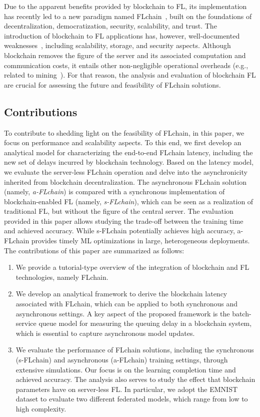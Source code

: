 \documentclass[lettersize,journal]{IEEEtran}
\begin{document}
Due to the apparent benefits provided by blockchain to FL, its implementation has recently led to a new paradigm named FLchain~\cite{majeed2019flchain, bao2019flchain}, built on the foundations of decentralization, democratization, security, scalability, and trust. The introduction of blockchain to FL applications has, however, well-documented weaknesses~\cite{zheng2018blockchain}, including scalability, storage, and security aspects. Although blockchain removes the figure of the server and its associated computation and communication costs, it entails other non-negligible operational overheads (e.g., related to mining~\cite{wilhelmi2021discrete}). For that reason, the analysis and evaluation of blockchain FL are crucial for assessing the future and feasibility of FLchain solutions.

\subsection{Contributions}

To contribute to shedding light on the feasibility of FLchain, in this paper, we focus on performance and scalability aspects. To this end, we first develop an analytical model for characterizing the end-to-end FLchain latency, including the new set of delays incurred by blockchain technology. Based on the latency model, we evaluate the server-less FLchain operation and delve into the asynchronicity inherited from blockchain decentralization. The asynchronous FLchain solution (namely, \textit{a-FLchain}) is compared with a synchronous implementation of blockchain-enabled FL (namely, \textit{s-FLchain}), which can be seen as a realization of traditional FL, but without the figure of the central server. The evaluation provided in this paper allows studying the trade-off between the training time and achieved accuracy. While s-FLchain potentially achieves high accuracy, a-FLchain provides timely ML optimizations in large, heterogeneous deployments. The contributions of this paper are summarized as follows:
\begin{enumerate}
	\item We provide a tutorial-type overview of the integration of blockchain and FL technologies, namely FLchain.
	\item We develop an analytical framework to derive the blockchain latency associated with FLchain, which can be applied to both synchronous and asynchronous settings. A key aspect of the proposed framework is the batch-service queue model for measuring the queuing delay in a blockchain system, which is essential to capture asynchronous model updates.
    \item We evaluate the performance of FLchain solutions, including the synchronous (s-FLchain) and asynchronous (a-FLchain) training settings, through extensive simulations. Our focus is on the learning completion time and achieved accuracy. The analysis also serves to study the effect that blockchain parameters have on server-less FL. In particular, we adopt the EMNIST~\cite{cohen_afshar_tapson_schaik_2017} dataset to evaluate two different federated models, which range from low to high complexity.
\end{enumerate}
\end{document}
